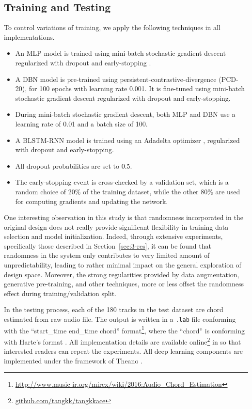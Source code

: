 
\subsection{Training and Testing}

To control variations of training, we apply the following techniques in all implementations. 
\begin{itemize}
\item An MLP model is trained using mini-batch stochastic gradient descent regularized with dropout \cite{srivastava2014dropout} and early-stopping \cite{prechelt1998automatic}. 
\item A DBN model is pre-trained using persistent-contrastive-divergence \cite{tieleman2008training} (PCD-20), for 100 epochs with learning rate 0.001. It is fine-tuned using mini-batch stochastic gradient descent regularized with dropout and early-stopping.
\item During mini-batch stochastic gradient descent, both MLP and DBN use a learning rate of 0.01 and a batch size of 100. 
\item A BLSTM-RNN model is trained using an Adadelta optimizer \cite{zeiler2012adadelta}, regularized with dropout and early-stopping. 
\item All dropout probabilities are set to 0.5. 
\item The early-stopping event is cross-checked by a validation set, which is a random choice of 20\% of the training dataset, while the other 80\% are used for computing gradients and updating the network.
\end{itemize}

One interesting observation in this study is that randomness incorporated in the original design does not really provide significant flexibility in training data selection and model initialization. Indeed, through extensive experiments, specifically those described in Section~\ref{sec:3-res}, it can be found that randomness in the system only contributes to very limited amount of unpredictability, leading to rather minimal impact on the general exploration of design space. Moreover, the strong regularities provided by data augmentation, generative pre-training, and other techniques, more or less offset the randomness effect during training/validation split.

In the testing process, each of the 180 tracks in the test dataset are chord estimated from raw audio file. The output is written in a {\tt .lab} file conforming with the ``start\_time end\_time chord'' format\footnote{\url{http://www.music-ir.org/mirex/wiki/2016:Audio\_Chord\_Estimation}}, where the ``chord'' is conforming with Harte's format \cite{harte2005symbolic}. All implementation details are available online\footnote{\url{github.com/tangkk/tangkkace}} in so that interested readers can repeat the experiments. All deep learning components are implemented under the framework of Theano \cite{bergstra2010theano}.

